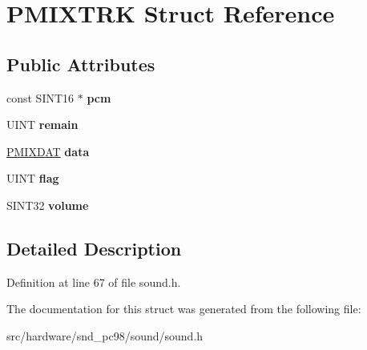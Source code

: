 \hypertarget{structPMIXTRK}{\section{P\-M\-I\-X\-T\-R\-K Struct Reference}
\label{structPMIXTRK}
}
\subsection*{Public Attributes}
\begin{DoxyCompactItemize}
\item 
\hypertarget{structPMIXTRK_ae29ceed2553724436af3fe929d4c6afd}{const S\-I\-N\-T16 $\ast$ {\bfseries pcm}}\label{structPMIXTRK_ae29ceed2553724436af3fe929d4c6afd}

\item 
\hypertarget{structPMIXTRK_a2186f8b72a1caefaab86f42f21b0c8fd}{U\-I\-N\-T {\bfseries remain}}\label{structPMIXTRK_a2186f8b72a1caefaab86f42f21b0c8fd}

\item 
\hypertarget{structPMIXTRK_aa440fd1313e8cfd451c150e40ee438c7}{\hyperlink{structPMIXDAT}{P\-M\-I\-X\-D\-A\-T} {\bfseries data}}\label{structPMIXTRK_aa440fd1313e8cfd451c150e40ee438c7}

\item 
\hypertarget{structPMIXTRK_ac6820c6e38a3581b12f7475a8c3470e9}{U\-I\-N\-T {\bfseries flag}}\label{structPMIXTRK_ac6820c6e38a3581b12f7475a8c3470e9}

\item 
\hypertarget{structPMIXTRK_aaa0b065bc7db6db426fcae3d4c5ee327}{S\-I\-N\-T32 {\bfseries volume}}\label{structPMIXTRK_aaa0b065bc7db6db426fcae3d4c5ee327}

\end{DoxyCompactItemize}


\subsection{Detailed Description}


Definition at line 67 of file sound.\-h.



The documentation for this struct was generated from the following file\-:\begin{DoxyCompactItemize}
\item 
src/hardware/snd\-\_\-pc98/sound/sound.\-h\end{DoxyCompactItemize}
